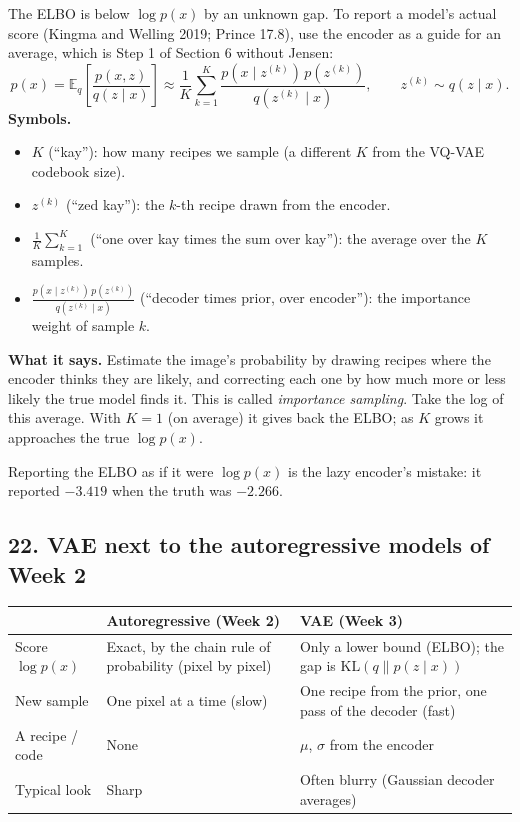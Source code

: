 The ELBO is below $\log p(x)$ by an unknown gap. To report a model's actual score (Kingma and Welling 2019; Prince 17.8), use the encoder as a guide for an average, which is Step 1 of Section 6 without Jensen:
\[
p(x) = \mathbb{E}_q\!\left[\frac{p(x, z)}{q(z \mid x)}\right]
\approx \frac{1}{K}\sum_{k=1}^{K}\frac{p(x \mid z^{(k)})\,p(z^{(k)})}{q(z^{(k)} \mid x)}, \qquad z^{(k)} \sim q(z \mid x).
\]
\textbf{Symbols.}
\begin{itemize}[leftmargin=1.5em, itemsep=0pt]
\item $K$ (``kay''): how many recipes we sample (a different $K$ from the VQ-VAE codebook size).
\item $z^{(k)}$ (``zed kay''): the $k$-th recipe drawn from the encoder.
\item $\frac{1}{K}\sum_{k=1}^{K}$ (``one over kay times the sum over kay''): the average over the $K$ samples.
\item $\frac{p(x \mid z^{(k)})\,p(z^{(k)})}{q(z^{(k)} \mid x)}$ (``decoder times prior, over encoder''): the importance weight of sample $k$.
\end{itemize}
\textbf{What it says.} Estimate the image's probability by drawing recipes where the encoder thinks they are likely, and correcting each one by how much more or less likely the true model finds it. This is called \emph{importance sampling}. Take the log of this average. With $K = 1$ (on average) it gives back the ELBO; as $K$ grows it approaches the true $\log p(x)$.

Reporting the ELBO as if it were $\log p(x)$ is the lazy encoder's mistake: it reported $-3.419$ when the truth was $-2.266$.

\subsection*{22. VAE next to the autoregressive models of Week 2}

\begin{center}
\begin{tabular}{>{\raggedright\arraybackslash}p{} >{\raggedright\arraybackslash}p{} >{\raggedright\arraybackslash}p{}}
\toprule
 & Autoregressive (Week 2) & VAE (Week 3) \\
\midrule
Score $\log p(x)$ & Exact, by the chain rule of probability (pixel by pixel) & Only a lower bound (ELBO); the gap is $\mathrm{KL}(q \| p(z \mid x))$ \\
New sample & One pixel at a time (slow) & One recipe from the prior, one pass of the decoder (fast) \\
A recipe / code & None & $\mu$, $\sigma$ from the encoder \\
Typical look & Sharp & Often blurry (Gaussian decoder averages) \\
\bottomrule
\end{tabular}
\end{center}

